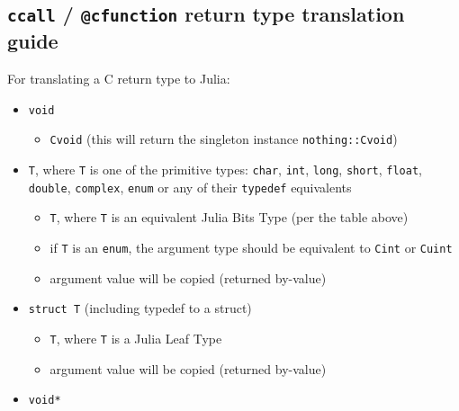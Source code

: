 \hypertarget{13507762415394207754}{}


\subsection{\texttt{ccall} / \texttt{@cfunction} return type translation guide}



For translating a C return type to Julia:



\begin{itemize}
\item \texttt{void}

\begin{itemize}
\item \texttt{Cvoid} (this will return the singleton instance \texttt{nothing::Cvoid})

\end{itemize}

\item \texttt{T}, where \texttt{T} is one of the primitive types: \texttt{char}, \texttt{int}, \texttt{long}, \texttt{short}, \texttt{float}, \texttt{double}, \texttt{complex}, \texttt{enum} or any of their \texttt{typedef} equivalents

\begin{itemize}
\item \texttt{T}, where \texttt{T} is an equivalent Julia Bits Type (per the table above)


\item if \texttt{T} is an \texttt{enum}, the argument type should be equivalent to \texttt{Cint} or \texttt{Cuint}


\item argument value will be copied (returned by-value)

\end{itemize}

\item \texttt{struct T} (including typedef to a struct)

\begin{itemize}
\item \texttt{T}, where \texttt{T} is a Julia Leaf Type


\item argument value will be copied (returned by-value)

\end{itemize}

\item \texttt{void*}


\end{itemize}
